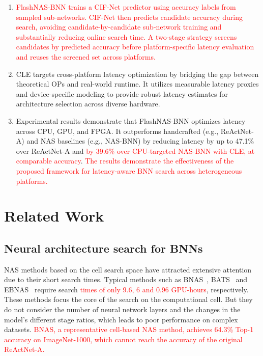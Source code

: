 \documentclass[a4paper,fleqn]{cas-sc}
\begin{document}
\begin{enumerate}
    \item {\textcolor{red}{FlashNAS-BNN trains a CIF-Net predictor using accuracy labels from sampled sub-networks. CIF-Net then predicts candidate accuracy during search, avoiding candidate-by-candidate sub-network training and substantially reducing online search time. A two-stage strategy screens candidates by predicted accuracy before platform-specific latency evaluation and reuses the screened set across platforms.}}
    \item {CLE targets cross-platform latency optimization by bridging the gap between theoretical OPs and real-world runtime. It utilizes measurable latency proxies and device-specific modeling to provide robust latency estimates for architecture selection across diverse hardware.}
    \item {Experimental results demonstrate that FlashNAS-BNN optimizes latency across CPU, GPU, and FPGA. It outperforms handcrafted (e.g., ReActNet-A) and NAS baselines (e.g., NAS-BNN) by reducing latency by up to 47.1\% over ReActNet-A and \textcolor{red}{by 39.6\% over CPU-targeted NAS-BNN with CLE, at comparable accuracy}. \textcolor{red}{The results demonstrate the effectiveness of the proposed framework for latency-aware BNN search across heterogeneous platforms.}}
\end{enumerate}

\section{Related Work}
\subsection{Neural architecture search for BNNs}
NAS methods based on the cell search space have attracted extensive attention due to their short search times. Typical methods such as BNAS~\cite{Kim2020}, BATS~\cite{Bulat2020} and EBNAS~\cite{Shi2023} require search \textcolor{red}{times of only 9.6, 6 and 0.96 GPU-hours}, respectively. These methods focus the core of the search on the computational cell. But they do not consider the number of neural network layers and the changes in the model's different stage ratios, which leads to poor performance on complex datasets. \textcolor{red}{BNAS, a representative cell-based NAS method, achieves 64.3\% Top-1 accuracy on ImageNet-1000, which cannot reach the accuracy of the original ReActNet-A.}
\end{document}
